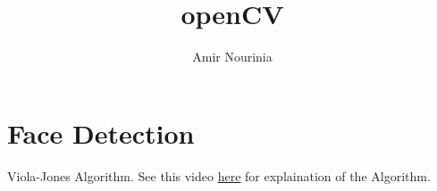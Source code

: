\documentclass[11pt,twoside,a4paper]{report}
\title{openCV}
\author{Amir Nourinia}
\begin{document}
\maketitle
\tableofcontents

\chapter{Face Detection}
Viola-Jones Algorithm. See this video \href{https://www.youtube.com/watch?v=WfdYYNamHZ8}{here} for explaination of the Algorithm.
\end{document}
